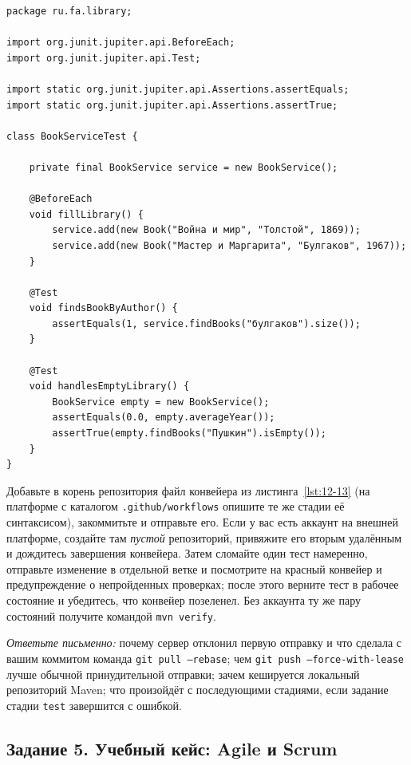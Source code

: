 \begin{listing}[H]
\begin{verbatim}
package ru.fa.library;

import org.junit.jupiter.api.BeforeEach;
import org.junit.jupiter.api.Test;

import static org.junit.jupiter.api.Assertions.assertEquals;
import static org.junit.jupiter.api.Assertions.assertTrue;

class BookServiceTest {

    private final BookService service = new BookService();

    @BeforeEach
    void fillLibrary() {
        service.add(new Book("Война и мир", "Толстой", 1869));
        service.add(new Book("Мастер и Маргарита", "Булгаков", 1967));
    }

    @Test
    void findsBookByAuthor() {
        assertEquals(1, service.findBooks("булгаков").size());
    }

    @Test
    void handlesEmptyLibrary() {
        BookService empty = new BookService();
        assertEquals(0.0, empty.averageYear());
        assertTrue(empty.findBooks("Пушкин").isEmpty());
    }
}
\end{verbatim}
\caption{Тесты службы книг}
\label{lst:12-16}
\end{listing}

Добавьте в корень репозитория файл конвейера из листинга~\ref{lst:12-13} (на платформе с каталогом \texttt{.github/workflows} опишите те же стадии её синтаксисом), закоммитьте и отправьте его. Если у вас есть аккаунт на внешней платформе, создайте там \emph{пустой} репозиторий, привяжите его вторым удалённым и дождитесь завершения конвейера. Затем сломайте один тест намеренно, отправьте изменение в отдельной ветке и посмотрите на красный конвейер и предупреждение о непройденных проверках; после этого верните тест в рабочее состояние и убедитесь, что конвейер позеленел. Без аккаунта ту же пару состояний получите командой \texttt{mvn verify}.

\emph{Ответьте письменно:} почему сервер отклонил первую отправку и что сделала с вашим коммитом команда \texttt{git pull --rebase}; чем \texttt{git push --force-with-lease} лучше обычной принудительной отправки; зачем кешируется локальный репозиторий Maven; что произойдёт с последующими стадиями, если задание стадии \texttt{test} завершится с ошибкой.

\subsection*{Задание 5. Учебный кейс: Agile и Scrum}


